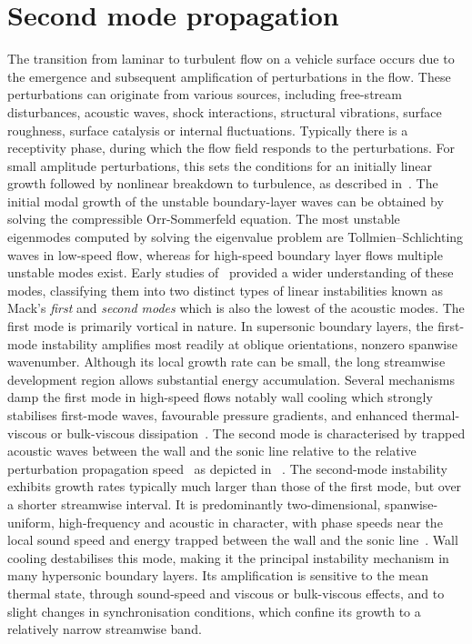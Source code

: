\section{Second mode propagation}
The transition from laminar to turbulent flow on a vehicle surface occurs due to the emergence and subsequent amplification of perturbations in the flow. These perturbations can originate from various sources, including free-stream disturbances, acoustic waves, shock interactions, structural vibrations, surface roughness, surface catalysis or internal fluctuations. Typically there is a receptivity phase, during which the flow field responds to the perturbations. For small amplitude perturbations, this sets the conditions for an initially linear growth followed by nonlinear breakdown to turbulence, as described in~\cite{reshotko2008}. The initial modal growth of the unstable boundary-layer waves can be obtained by solving the compressible Orr-Sommerfeld equation. The most unstable eigenmodes computed by solving the eigenvalue problem are Tollmien–Schlichting waves in low-speed flow, whereas for high-speed boundary layer flows multiple unstable modes exist. Early studies of~\cite{Mack1969} provided a wider understanding of these modes, classifying them into two distinct types of linear instabilities known as Mack's \textit{first} and \textit{second modes} which is also the lowest of the acoustic modes. The first mode is primarily vortical in nature. In supersonic boundary layers, the first-mode instability amplifies most readily at oblique orientations, nonzero spanwise wavenumber. Although its local growth rate can be small, the long streamwise development region allows substantial energy accumulation. Several mechanisms damp the first mode in high-speed flows notably wall cooling which strongly stabilises first-mode waves, favourable pressure gradients, and enhanced thermal-viscous or bulk-viscous dissipation~\citep{Mack1984}.
The second mode is characterised by trapped acoustic waves between the wall and the sonic line relative to the relative perturbation propagation speed~\cite{Fedorov2001} as depicted in ~. The second-mode instability exhibits growth rates typically much larger than those of the first mode, but over a shorter streamwise interval. It is predominantly two-dimensional, spanwise-uniform, high-frequency and acoustic in character, with phase speeds near the local sound speed and energy trapped between the wall and the sonic line~\citep{DeTullio2013}. Wall cooling destabilises this mode, making it the principal instability mechanism in many hypersonic boundary layers. Its amplification is sensitive to the mean thermal state, through sound-speed and viscous or bulk-viscous effects, and to slight changes in synchronisation conditions, which confine its growth to a relatively narrow streamwise band.


